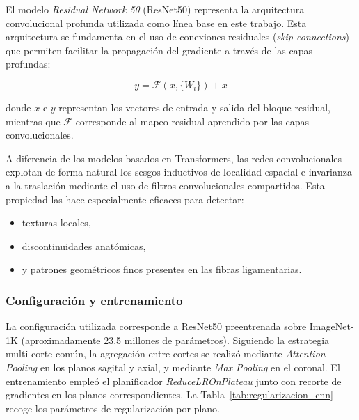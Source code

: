 El modelo \textit{Residual Network 50} (ResNet50) \cite{he2016deep} representa la arquitectura convolucional profunda utilizada como línea base en este trabajo. Esta arquitectura se fundamenta en el uso de conexiones residuales (\textit{skip connections}) que permiten facilitar la propagación del gradiente a través de las capas profundas:

\begin{equation}
y = \mathcal{F}(x, \{W_i\}) + x
\end{equation}

\noindent donde $x$ e $y$ representan los vectores de entrada y salida del bloque residual, mientras que $\mathcal{F}$ corresponde al mapeo residual aprendido por las capas convolucionales.

A diferencia de los modelos basados en Transformers, las redes convolucionales explotan de forma natural los sesgos inductivos de localidad espacial e invarianza a la traslación mediante el uso de filtros convolucionales compartidos. Esta propiedad las hace especialmente eficaces para detectar:
\begin{itemize}
    \item texturas locales,
    \item discontinuidades anatómicas,
    \item y patrones geométricos finos presentes en las fibras ligamentarias.
\end{itemize}

\subsubsection{Configuración y entrenamiento}

La configuración utilizada corresponde a ResNet50 preentrenada sobre ImageNet-1K (aproximadamente 23.5 millones de parámetros). Siguiendo la estrategia multi-corte común, la agregación entre cortes se realizó mediante \textit{Attention Pooling} en los planos sagital y axial, y mediante \textit{Max Pooling} en el coronal. El entrenamiento empleó el planificador \textit{ReduceLROnPlateau} junto con recorte de gradientes en los planos correspondientes. La Tabla~\ref{tab:regularizacion_cnn} recoge los parámetros de regularización por plano.

